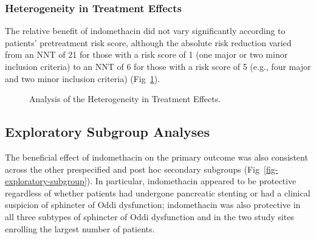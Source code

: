 \documentclass[
  10pt,
  letterpaper,
]{article}
\begin{document}
\subsubsection{Heterogeneity in Treatment
Effects}\label{heterogeneity-in-treatment-effects}

The relative benefit of indomethacin did not vary significantly
according to patients' pretreatment risk score, although the absolute
risk reduction varied from an NNT of 21 for those with a risk score of 1
(one major or two minor inclusion criteria) to an NNT of 6 for those
with a risk score of 5 (e.g., four major and two minor inclusion
criteria) (Fig~\ref{fig-heterogeneity}).

\begin{figure}


\caption{\label{fig-heterogeneity}Analysis of the Heterogeneity in
Treatment Effects.}

\end{figure}%

\subsection{Exploratory Subgroup
Analyses}\label{exploratory-subgroup-analyses}

The beneficial effect of indomethacin on the primary outcome was also
consistent across the other prespecified and post hoc secondary
subgroups (Fig~\ref{fig-exploratory-subgroup}). In particular,
indomethacin appeared to be protective regardless of whether patients
had undergone pancreatic stenting or had a clinical suspicion of
sphincter of Oddi dysfunction; indomethacin was also protective in all
three subtypes of sphincter of Oddi dysfunction and in the two study
sites enrolling the largest number of patients.
\end{document}
